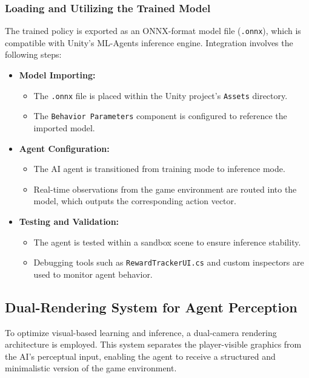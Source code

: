 \documentclass[12pt,oneside,openright,a4paper]{cpe-english-project}
\begin{document}
\subsubsection{Loading and Utilizing the Trained Model}
The trained policy is exported as an ONNX-format model file (\texttt{.onnx}), which is compatible with Unity’s ML-Agents inference engine. Integration involves the following steps:\par
\begin{itemize}
\item \textbf{Model Importing:}
\begin{itemize}
\item The \texttt{.onnx} file is placed within the Unity project’s \texttt{Assets} directory.
\item The \texttt{Behavior Parameters} component is configured to reference the imported model.
\end{itemize}
\item \textbf{Agent Configuration:}
\begin{itemize}
\item The AI agent is transitioned from training mode to inference mode.
\item Real-time observations from the game environment are routed into the model, which outputs the corresponding action vector.
\end{itemize}
\item \textbf{Testing and Validation:}
\begin{itemize}
\item The agent is tested within a sandbox scene to ensure inference stability.
\item Debugging tools such as \texttt{RewardTrackerUI.cs} and custom inspectors are used to monitor agent behavior.
\end{itemize}
\end{itemize}
\subsection{Dual-Rendering System for Agent Perception}
To optimize visual-based learning and inference, a dual-camera rendering architecture is employed. This system separates the player-visible graphics from the AI’s perceptual input, enabling the agent to receive a structured and minimalistic version of the game environment.
\end{document}
